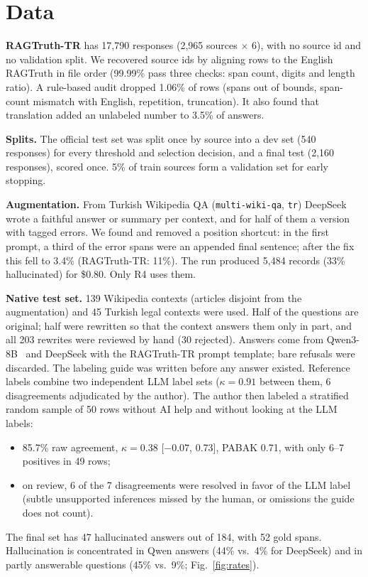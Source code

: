 \documentclass[conference,a4paper]{IEEEtran}
\begin{document}
\section{Data}
\textbf{RAGTruth-TR} has 17,790 responses (2,965 sources $\times$ 6), with no source id and no validation split. We recovered source ids by aligning rows to the English RAGTruth in file order (99.99\% pass three checks: span count, digits and length ratio). A rule-based audit dropped 1.06\% of rows (spans out of bounds, span-count mismatch with English, repetition, truncation). It also found that translation added an unlabeled number to 3.5\% of answers.

\textbf{Splits.} The official test set was split once by source into a dev set (540 responses) for every threshold and selection decision, and a final test (2,160 responses), scored once. 5\% of train sources form a validation set for early stopping.

\textbf{Augmentation.} From Turkish Wikipedia QA (\texttt{multi-wiki-qa}, \texttt{tr}) DeepSeek wrote a faithful answer or summary per context, and for half of them a version with tagged errors. We found and removed a position shortcut: in the first prompt, a third of the error spans were an appended final sentence; after the fix this fell to 3.4\% (RAGTruth-TR: 11\%). The run produced 5,484 records (33\% hallucinated) for \$0.80. Only R4 uses them.

\textbf{Native test set.} 139 Wikipedia contexts (articles disjoint from the augmentation) and 45 Turkish legal contexts were used. Half of the questions are original; half were rewritten so that the context answers them only in part, and all 203 rewrites were reviewed by hand (30 rejected). Answers come from Qwen3-8B~\cite{yang2025qwen3} and DeepSeek with the RAGTruth-TR prompt template; bare refusals were discarded. The labeling guide was written before any answer existed. Reference labels combine two independent LLM label sets ($\kappa = 0.91$ between them, 6 disagreements adjudicated by the author). The author then labeled a stratified random sample of 50 rows without AI help and without looking at the LLM labels:
\begin{itemize}
\item 85.7\% raw agreement, $\kappa = 0.38$ [$-0.07$, 0.73], PABAK 0.71, with only 6--7 positives in 49 rows;
\item on review, 6 of the 7 disagreements were resolved in favor of the LLM label (subtle unsupported inferences missed by the human, or omissions the guide does not count).
\end{itemize}
The final set has 47 hallucinated answers out of 184, with 52 gold spans. Hallucination is concentrated in Qwen answers (44\% vs.\ 4\% for DeepSeek) and in partly answerable questions (45\% vs.\ 9\%; Fig.~\ref{fig:rates}).
\end{document}
